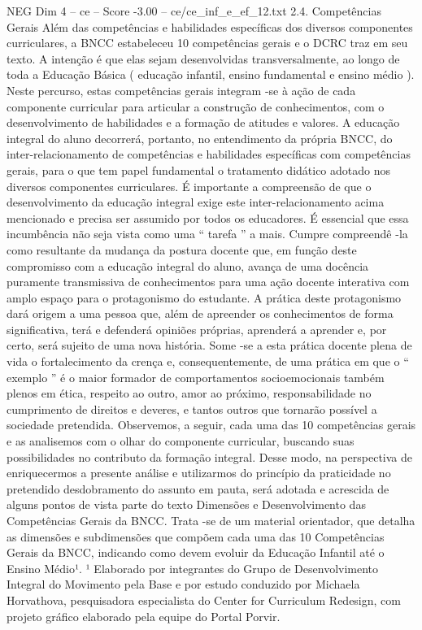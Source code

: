 \begin{textsample}{NEG Dim 4 – ce – Score -3.00 – ce/ce\_inf\_e\_ef\_12.txt}  \label{ex:f4_neg_152}
2.4.
Competências Gerais Além das competências e habilidades específicas dos diversos componentes curriculares, a BNCC estabeleceu 10 competências gerais e o DCRC traz em seu texto.
A intenção é que elas sejam desenvolvidas transversalmente, ao longo de toda a Educação Básica ( educação infantil, ensino fundamental e ensino médio ).
Neste percurso, estas competências gerais integram -se à ação de cada componente curricular para articular a construção de conhecimentos, com o desenvolvimento de habilidades e a formação de atitudes e valores.
A educação integral do aluno decorrerá, portanto, no entendimento da própria BNCC, do inter-relacionamento de competências e habilidades específicas com competências gerais, para o que tem papel fundamental o tratamento didático adotado nos diversos componentes curriculares.
É importante a compreensão de que o desenvolvimento da educação integral exige este inter-relacionamento acima mencionado e precisa ser assumido por todos os educadores.
É essencial que essa incumbência não seja vista como uma “ tarefa ” a mais.
Cumpre compreendê -la como resultante da mudança da postura docente que, em função deste compromisso com a educação integral do aluno, avança de uma docência puramente transmissiva de conhecimentos para uma ação docente interativa com amplo espaço para o protagonismo do estudante.
A prática deste protagonismo dará origem a uma pessoa que, além de apreender os conhecimentos de forma significativa, terá e defenderá opiniões próprias, aprenderá a aprender e, por certo, será sujeito de uma nova história.
Some -se a esta prática docente plena de vida o fortalecimento da crença e, consequentemente, de uma prática em que o “ exemplo ” é o maior formador de comportamentos socioemocionais também plenos em ética, respeito ao outro, amor ao próximo, responsabilidade no cumprimento de direitos e deveres, e tantos outros que tornarão possível a sociedade pretendida.
Observemos, a seguir, cada uma das 10 competências gerais e as analisemos com o olhar do componente curricular, buscando suas possibilidades no contributo da formação integral.
Desse modo, na perspectiva de enriquecermos a presente análise e utilizarmos do princípio da praticidade no pretendido desdobramento do assunto em pauta, será adotada e acrescida de alguns pontos de vista parte do texto Dimensões e Desenvolvimento das Competências Gerais da BNCC.
Trata -se de um material orientador, que detalha as dimensões e subdimensões que compõem cada uma das 10 Competências Gerais da BNCC, indicando como devem evoluir da Educação Infantil até o Ensino Médio¹. ¹ Elaborado por integrantes do Grupo de Desenvolvimento Integral do Movimento pela Base e por estudo conduzido por Michaela Horvathova, pesquisadora especialista do Center for Curriculum Redesign, com projeto gráfico elaborado pela equipe do Portal Porvir.

\end{textsample}
